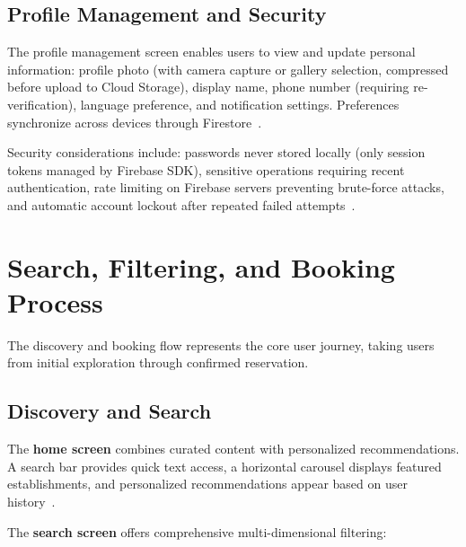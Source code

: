 \subsection{Profile Management and Security}
\label{subsec:profile-security}

The profile management screen enables users to view and update personal information: profile photo (with camera capture or gallery selection, compressed before upload to Cloud Storage), display name, phone number (requiring re-verification), language preference, and notification settings.
Preferences synchronize across devices through Firestore~\cite{firebase_firestore2024}.

Security considerations include: passwords never stored locally (only session tokens managed by Firebase SDK), sensitive operations requiring recent authentication, rate limiting on Firebase servers preventing brute-force attacks, and automatic account lockout after repeated failed attempts~\cite{firebase_auth2024}.


\section{Search, Filtering, and Booking Process}
\label{sec:search-booking}

The discovery and booking flow represents the core user journey, taking users from initial exploration through confirmed reservation.

\subsection{Discovery and Search}
\label{subsec:discovery}

The \textbf{home screen} combines curated content with personalized recommendations.
A search bar provides quick text access, a horizontal carousel displays featured establishments, and personalized recommendations appear based on user history~\cite{nielsen2012}.

The \textbf{search screen} offers comprehensive multi-dimensional filtering:

